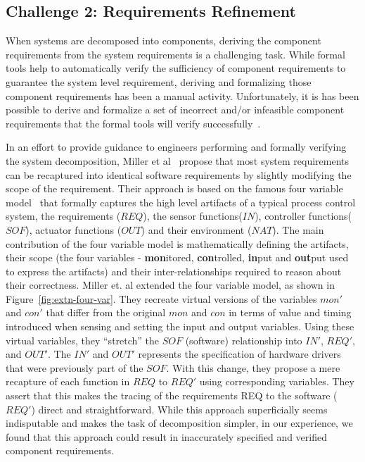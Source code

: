 \subsection{Challenge 2: Requirements Refinement}

When systems are decomposed into components, deriving the component requirements from the system requirements is a challenging task. While formal tools help to automatically verify the sufficiency of component requirements to guarantee the system level requirement, deriving and formalizing those component requirements has been a manual activity. Unfortunately, it is has been possible to derive and formalize a set of incorrect and/or infeasible component requirements that the formal tools will verify successfully~\cite{gacek2015towards}.

In an effort to provide guidance to engineers performing and formally verifying the system decomposition, Miller et al~\cite{extending4varmodel} propose that most system requirements can be recaptured into identical software requirements by slightly modifying the scope of the requirement. Their approach is based on the famous four variable model~\cite{Parnas91:four-variable} that formally captures the high level artifacts of a typical process control system, the requirements ($REQ$), the sensor functions($IN$), controller functions($SOF$), actuator functions ($OUT$) and their environment ($NAT$). The main contribution of the four variable model is mathematically defining the artifacts, their scope (the four variables - \textbf{mon}itored, \textbf{con}trolled, \textbf{in}put and \textbf{out}put used to express the artifacts) and their inter-relationships required to reason about their correctness. Miller et. al extended the four variable model, as shown in Figure~\ref{fig:extn-four-var}. They recreate virtual versions of the variables $mon'$ and $con'$ that differ from the original $mon$ and $con$ in terms of value and timing introduced when sensing and setting the input and output variables. Using these virtual variables, they ``stretch'' the $SOF$ (software) relationship into $IN'$, $REQ'$, and $OUT'$. The $IN'$ and $OUT'$ represents the specification of hardware drivers that were previously part of the $SOF$. With this change, they propose a mere recapture of each function in $REQ$ to $REQ'$ using corresponding variables. They assert that this makes the tracing of the requirements REQ to the software ($REQ'$) direct and straightforward. While this approach superficially seems indisputable and makes the task of decomposition simpler, in our experience, we found that this approach could result in inaccurately specified and verified component requirements.
